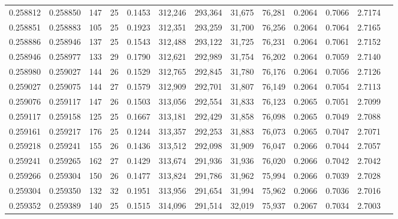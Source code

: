 \begin{tabular}{rrrrrrrrrrrrr}
0.258812 & 0.258850 &   147 &  25 &                                     0.1453 & 312,246 & 293,364 &  31,675 &  76,281 & 0.2064 & 0.7066 & 2.7174 \\
0.258851 & 0.258883 &   105 &  25 &                                     0.1923 & 312,351 & 293,259 &  31,700 &  76,256 & 0.2064 & 0.7064 & 2.7165 \\
0.258886 & 0.258946 &   137 &  25 &                                     0.1543 & 312,488 & 293,122 &  31,725 &  76,231 & 0.2064 & 0.7061 & 2.7152 \\
0.258946 & 0.258977 &   133 &  29 &                                     0.1790 & 312,621 & 292,989 &  31,754 &  76,202 & 0.2064 & 0.7059 & 2.7140 \\
0.258980 & 0.259027 &   144 &  26 &                                     0.1529 & 312,765 & 292,845 &  31,780 &  76,176 & 0.2064 & 0.7056 & 2.7126 \\
0.259027 & 0.259075 &   144 &  27 &                                     0.1579 & 312,909 & 292,701 &  31,807 &  76,149 & 0.2064 & 0.7054 & 2.7113 \\
0.259076 & 0.259117 &   147 &  26 &                                     0.1503 & 313,056 & 292,554 &  31,833 &  76,123 & 0.2065 & 0.7051 & 2.7099 \\
0.259117 & 0.259158 &   125 &  25 &                                     0.1667 & 313,181 & 292,429 &  31,858 &  76,098 & 0.2065 & 0.7049 & 2.7088 \\
0.259161 & 0.259217 &   176 &  25 &                                     0.1244 & 313,357 & 292,253 &  31,883 &  76,073 & 0.2065 & 0.7047 & 2.7071 \\
0.259218 & 0.259241 &   155 &  26 &                                     0.1436 & 313,512 & 292,098 &  31,909 &  76,047 & 0.2066 & 0.7044 & 2.7057 \\
0.259241 & 0.259265 &   162 &  27 &                                     0.1429 & 313,674 & 291,936 &  31,936 &  76,020 & 0.2066 & 0.7042 & 2.7042 \\
0.259266 & 0.259304 &   150 &  26 &                                     0.1477 & 313,824 & 291,786 &  31,962 &  75,994 & 0.2066 & 0.7039 & 2.7028 \\
0.259304 & 0.259350 &   132 &  32 &                                     0.1951 & 313,956 & 291,654 &  31,994 &  75,962 & 0.2066 & 0.7036 & 2.7016 \\
0.259352 & 0.259389 &   140 &  25 &                                     0.1515 & 314,096 & 291,514 &  32,019 &  75,937 & 0.2067 & 0.7034 & 2.7003 \\

\end{tabular}
